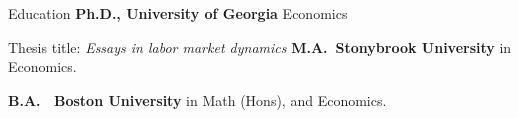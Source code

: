 \begin{rubric}{Education}
\entry*[2019 -- 2024]%
	\textbf{Ph.D., University of Georgia} Economics
	\par Thesis title: \emph{Essays in labor market dynamics}
%
\entry*[2017 -- 2019]%
	\textbf{M.A.~Stonybrook University} in Economics.\par
% 
\entry*[2013 -- 2016]%
	\textbf{B.A. ~Boston University} in Math (Hons), and Economics.\par
\end{rubric}
